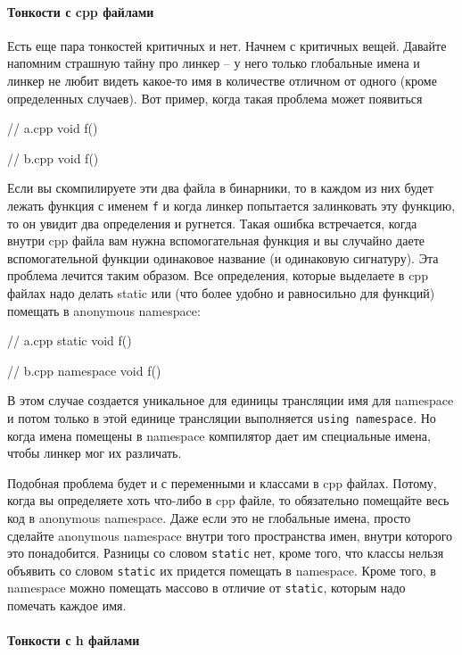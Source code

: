 \documentclass{article}
\begin{document}
\paragraph{Тонкости с cpp файлами}

Есть еще пара тонкостей критичных и нет. Начнем с критичных вещей. Давайте напомним страшную тайну про линкер -- у него только глобальные имена и линкер не любит видеть какое-то имя в количестве отличном от одного (кроме определенных случаев). Вот пример, когда такая проблема может появиться
\begin{cppcode}
// a.cpp
void f() {}

// b.cpp
void f() {}
\end{cppcode}
Если вы скомпилируете эти два файла в бинарники, то в каждом из них будет лежать функция с именем \verb"f" и когда линкер попытается залинковать эту функцию, то он увидит два определения и ругнется. Такая ошибка встречается, когда внутри cpp файла вам нужна вспомогательная функция и вы случайно даете вспомогательной функции одинаковое название (и одинаковую сигнатуру). Эта проблема лечится таким образом. Все определения, которые выделаете в cpp файлах надо делать static или (что более удобно и равносильно для функций) помещать в anonymous namespace:
\begin{cppcode}
// a.cpp
static void f() {}

// b.cpp
namespace {
void f() {}
}
\end{cppcode}
В этом случае создается уникальное для единицы трансляции имя для namespace и потом только в этой единице трансляции выполняется \verb"using namespace". Но когда имена помещены в namespace компилятор дает им специальные имена, чтобы линкер мог их различать.

Подобная проблема будет и с переменными и классами в cpp файлах. Потому, когда вы определяете хоть что-либо в cpp файле, то обязательно помещайте весь код в anonymous namespace. Даже если это не глобальные имена, просто сделайте anonymous namespace внутри того пространства имен, внутри которого это понадобится. Разницы со словом \verb"static" нет, кроме того, что классы нельзя объявить со словом \verb"static" их придется помещать в namespace. Кроме того, в namespace можно помещать массово в отличие от \verb"static", которым надо помечать каждое имя.

\paragraph{Тонкости с h файлами}
\end{document}
